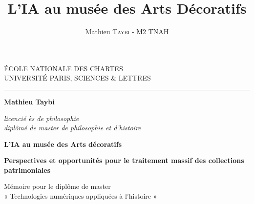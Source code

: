 \documentclass[12pt,twoside]{book}
\author{Mathieu \textsc{Taybi} - M2 TNAH}
\title{L'IA au musée des Arts Décoratifs}
\begin{document}
	\begin{titlepage}
		\begin{center}
			
			\bigskip
			
			\begin{large}				
				ÉCOLE NATIONALE DES CHARTES\\
				UNIVERSITÉ PARIS, SCIENCES \& LETTRES
			\end{large}
			\begin{center}\rule{2cm}{0.02cm}\end{center}
			
			\bigskip
			\bigskip
			\bigskip
			\begin{Large}
				\textbf{Mathieu Taybi}\\
			\end{Large}
			\begin{normalsize} \textit{licencié ès de philosophie}\\
				\textit{diplômé de master de philosophie et d'histoire}
			\end{normalsize}
			
			\bigskip
			\bigskip
			\bigskip
			
			\begin{Huge}
				\textbf{L'IA au musée des Arts décoratifs}\\
			\end{Huge}
			\bigskip
			\bigskip
			\begin{LARGE}
				\textbf{Perspectives et opportunités pour le traitement massif des collections patrimoniales}\\
			\end{LARGE}
			
			\bigskip
			\bigskip
			\bigskip
			\begin{large}
			\end{large}
			\vfill
			
			\begin{large}
				Mémoire 
				pour le diplôme de master \\
				« Technologies numériques appliquées à l'histoire » \\
			\end{large}
			
		\end{center}
	\end{titlepage}
	
\frontmatter

\end{document}
